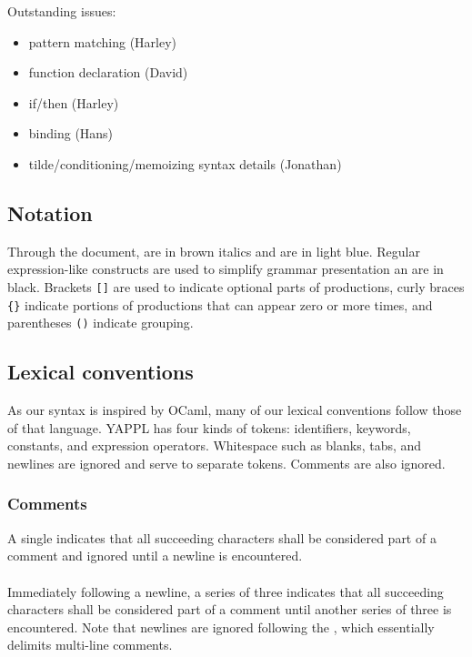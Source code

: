
Outstanding issues:
\begin{itemize}
\item pattern matching (Harley)
\item function declaration (David)
\item if/then (Harley)
\item binding (Hans)
\item tilde/conditioning/memoizing syntax details (Jonathan)
\end{itemize}

\subsection{Notation}

Through the document,  are in brown italics and  are in light blue. Regular expression-like constructs are used to simplify grammar presentation an are in black. Brackets \texttt{[]} are used to indicate optional parts of productions, curly braces \texttt{\{\}} indicate portions of productions that can appear zero or more times, and parentheses \texttt{()} indicate grouping. 

\subsection{Lexical conventions}

As our syntax is inspired by OCaml, many of our lexical conventions follow those of that language. YAPPL has four kinds of tokens: identifiers, keywords, constants, and expression operators. Whitespace such as blanks, tabs, and newlines are ignored and serve to separate tokens. Comments are also ignored.

\subsubsection{Comments}

A single \term{\#} indicates that all succeeding characters shall be considered part of a comment and ignored until a newline is encountered. \\
\\
Immediately following a newline, a series of three \term{\#\#\#} indicates that all succeeding characters shall be considered part of a comment until another series of three \term{\#\#\#} is encountered. Note that newlines are ignored following the \term{\#\#\#}, which essentially delimits multi-line comments.

